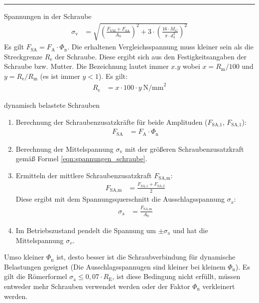 \hrule
\begin{eeqn}{Spannungen in der Schraube}
	\begin{align}
		\sigma_\text{v} &= \sqrt{\left(\frac{F_\text{VM}+F_\text{SA}}{A_\text{S}}\right)^2+3\cdot \left(\frac{16 \cdot M_\text{G}}{\pi \cdot d_3^3}\right)^2} \label{eqn:spannungen_schraube}
	\end{align}
	Es gilt $F_\text{SA} = F_\text{A}\cdot \Phi_\text{n}$. Die erhaltenen Vergleichsspannung muss kleiner sein als die Streckgrenze $R_\text{e}$ der Schraube. Diese ergibt sich aus den Festigkeitsangaben der Schraube bzw. Mutter. Die Bezeichnung lautet immer $x.y$ wobei $x=R_\text{m}/100$ und $y=R_\text{e}/R_\text{m}$ (es ist immer $y < 1$). Es gilt:
	\begin{align}
		R_\text{e} &= x \cdot 100 \cdot y ~\text{N/mm}^2
	\end{align}
\end{eeqn}


\begin{eeqn}{dynamisch belastete Schrauben}
	\begin{enumerate}[itemsep=0mm,leftmargin=12pt]
	\item Berechnung der Schraubenzusatzkräfte für beide Amplituden ($F_\text{SA,1}$, $F_\text{SA,1}$):
	\begin{align}
		F_\text{SA} &= F_\text{A}\cdot \Phi_\text{n}
	\end{align}
	\item Berechnung der Mittelspannung $\sigma_\text{v}$ mit der größeren Schraubenzusatzkraft gemäß Formel \ref{eqn:spannungen_schraube}.
	\item Ermitteln der mittlere Schraubenzusatzkraft $F_\text{SA,m}$:
	\begin{align}
		F_\text{SA,m} &= \frac{F_\text{SA,1} + F_\text{SA,2}}{2}
	\end{align}
	Diese ergibt mit dem Spannungsquerschnitt die Ausschlagsspannung $\sigma_\text{a}$:
	\begin{align}
		\sigma_\text{a} &= \frac{F_\text{SA,m}}{A_\text{S}}
	\end{align}
	\item Im Betriebszustand pendelt die Spannung um $\pm \sigma_\text{a}$ und hat die Mittelspannung $\sigma_{v}$.
	\end{enumerate}
	Umso kleiner $\Phi_\text{n}$ ist, desto besser ist die Schraubverbindung für dynamische Belastungen geeignet (Die Ausschlagsspannugen sind kleiner bei kleinem $\Phi_\text{n}$).
	Es gilt die Römerformel $\sigma_\text{a} \le 0,07 \cdot R_\text{E}$, ist diese Bedingung nicht erfüllt, müssen entweder mehr Schrauben verwendet werden oder der Faktor $\Phi_\text{n}$ verkleinert werden. \\
\end{eeqn}

